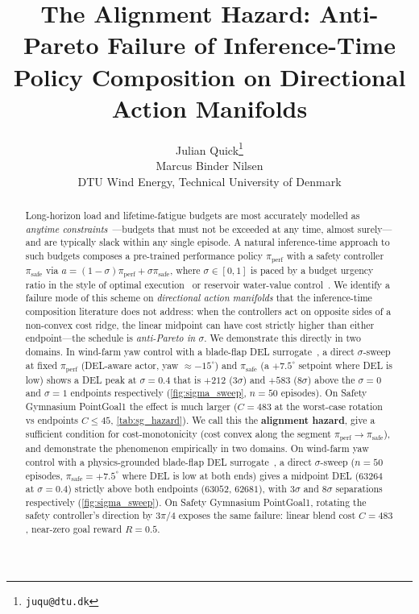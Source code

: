 \documentclass{article}
\title{The Alignment Hazard: Anti-Pareto Failure of Inference-Time Policy Composition on Directional Action Manifolds}
\author{Julian Quick\thanks{\texttt{juqu@dtu.dk}} \\ Marcus Binder Nilsen \\
DTU Wind Energy, Technical University of Denmark}
\begin{document}
\maketitle

\begin{abstract}
Long-horizon load and lifetime-fatigue budgets are most accurately modelled as \emph{anytime constraints}~\citep{mcmahan2024anytime}---budgets that must not be exceeded at any time, almost surely---and are typically slack within any single episode.
A natural inference-time approach to such budgets composes a pre-trained performance policy $\pi_{\mathrm{perf}}$ with a safety controller $\pi_{\mathrm{safe}}$ via $a=(1-\sigma)\pi_{\mathrm{perf}} + \sigma\pi_{\mathrm{safe}}$, where $\sigma\in[0,1]$ is paced by a budget urgency ratio in the style of optimal execution~\citep{almgren2001optimal} or reservoir water-value control~\citep{tilmant2008water, you2008hedging}.
We identify a failure mode of this scheme on \emph{directional action manifolds} that the inference-time composition literature does not address: when the controllers act on opposite sides of a non-convex cost ridge, the linear midpoint can have cost strictly higher than either endpoint---the schedule is \emph{anti-Pareto in $\sigma$}.
We demonstrate this directly in two domains.
In wind-farm yaw control with a blade-flap DEL surrogate~\citep{guillore2024sectoravg}, a direct $\sigma$-sweep at fixed $\pi_{\mathrm{perf}}$ (DEL-aware actor, yaw $\approx -15^\circ$) and $\pi_{\mathrm{safe}}$ (a $+7.5^\circ$ setpoint where DEL is low) shows a DEL peak at $\sigma=0.4$ that is $+212$ (3$\sigma$) and $+583$ (8$\sigma$) above the $\sigma\!=\!0$ and $\sigma\!=\!1$ endpoints respectively (\cref{fig:sigma_sweep}, $n=50$ episodes).
On Safety Gymnasium PointGoal1 the effect is much larger ($C\!=\!483$ at the worst-case rotation vs endpoints $C\!\le\!45$, \cref{tab:sg_hazard}).
We call this the \textbf{alignment hazard}, give a sufficient condition for cost-monotonicity (cost convex along the segment $\pi_{\mathrm{perf}}\to\pi_{\mathrm{safe}}$), and demonstrate the phenomenon empirically in two domains.
On wind-farm yaw control with a physics-grounded blade-flap DEL surrogate~\citep{guillore2024sectoravg}, a direct $\sigma$-sweep ($n=50$ episodes, $\pi_{\mathrm{safe}}=+7.5^\circ$ where DEL is low at both ends) gives a midpoint DEL ($63264$ at $\sigma\!=\!0.4$) strictly above both endpoints ($63052$, $62681$), with $3\sigma$ and $8\sigma$ separations respectively (\cref{fig:sigma_sweep}).
On Safety Gymnasium PointGoal1, rotating the safety controller's direction by $3\pi/4$ exposes the same failure: linear blend cost $C=483$, near-zero goal reward $R=0.5$.

\end{abstract}
\end{document}
